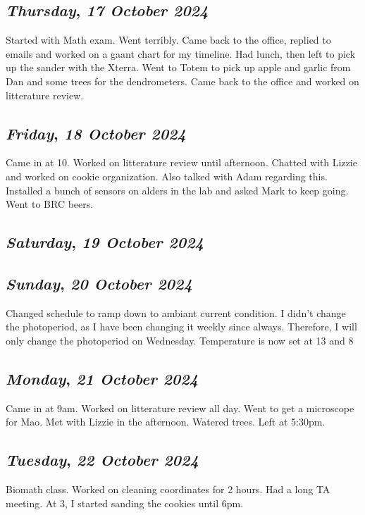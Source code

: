 \def\day{\textit{17 October 2024}}
\def\weekday{\textit{Thursday}}
\subsection*{\weekday, \day}
Started with Math exam. Went terribly. Came back to the office, replied to emails and worked on a gaant chart for my timeline. Had lunch, then left to pick up the sander with the Xterra. Went to Totem to pick up apple and garlic from Dan and some trees for the dendrometers. Came back to the office and worked on litterature review. 

\def\day{\textit{18 October 2024}}
\def\weekday{\textit{Friday}}
\subsection*{\weekday, \day}
Came in at 10. Worked on litterature review until afternoon. Chatted with Lizzie and worked on cookie organization. Also talked with Adam regarding this. Installed a bunch of sensors on alders in the lab and asked Mark to keep going. Went to BRC beers. 
\def\day{\textit{19 October 2024}}
\def\weekday{\textit{Saturday}}
\subsection*{\weekday, \day}

\def\day{\textit{20 October 2024}}
\def\weekday{\textit{Sunday}}
\subsection*{\weekday, \day}
Changed schedule to ramp down to ambiant current condition. I didn't change the photoperiod, as I have been changing it weekly since always. Therefore, I will only change the photoperiod on Wednesday. Temperature is now set at 13 and 8

\def\day{\textit{21 October 2024}}
\def\weekday{\textit{Monday}}
\subsection*{\weekday, \day}
Came in at 9am. Worked on litterature review all day. Went to get a microscope for Mao. Met with Lizzie in the afternoon. Watered trees. Left at 5:30pm. 

\def\day{\textit{22 October 2024}}
\def\weekday{\textit{Tuesday}}
\subsection*{\weekday, \day}
Biomath class. Worked on cleaning coordinates for 2 hours. Had a long TA meeting. At 3, I started sanding the cookies until 6pm. 

